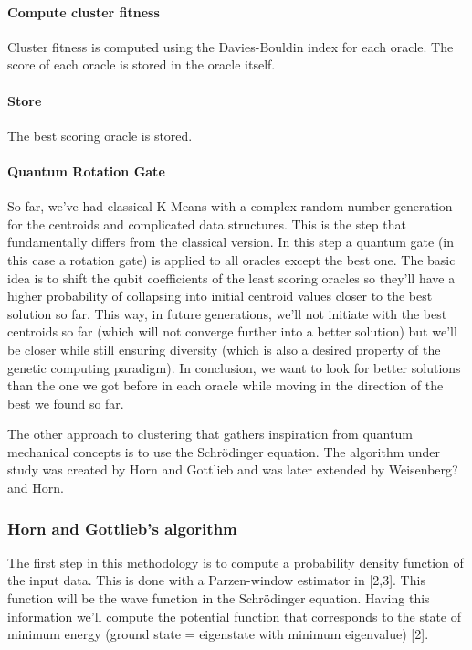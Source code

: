 \paragraph{Compute cluster fitness}
Cluster fitness is computed using the Davies-Bouldin index for each oracle. The score of each oracle is stored in the oracle itself.

\paragraph{Store}
The best scoring oracle is stored.

\paragraph{Quantum Rotation Gate}
So far, we've had classical K-Means with a complex random number generation for the centroids and complicated data structures. This is the step that fundamentally differs from the classical version. In this step a quantum gate (in this case a rotation gate) is applied to all oracles except the best one. The basic idea is to shift the qubit coefficients of the least scoring oracles so they'll have a higher probability of collapsing into initial centroid values closer to the best solution so far. This way, in future generations, we'll not initiate with the best centroids so far (which will not converge further into a better solution) but we'll be closer while still ensuring diversity (which is also a desired property of the genetic computing paradigm). In conclusion, we want to look for better solutions than the one we got before in each oracle while moving in the direction of the best we found so far.


The other approach to clustering that gathers inspiration from quantum mechanical concepts is to use the Schrödinger equation. The algorithm under study was created by Horn and Gottlieb and was later extended by Weisenberg? and Horn.


\subsubsection{Horn and Gottlieb's algorithm}

The first step in this methodology is to compute a probability density function of the input data. This is done with a Parzen-window estimator in [2,3]. This function will be the wave function in the Schrödinger equation. Having this information we'll compute the potential function that corresponds to the state of minimum energy (ground state = eigenstate with minimum eigenvalue) [2].

